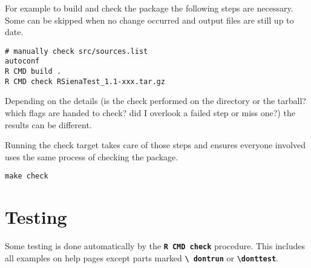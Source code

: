 \documentclass[12pt, a4paper]{article}
\renewcommand{\=}{\,=\,}
\newcommand{\+}{\,+\,}
\newcommand{\sfn}[1]{\textbf{\texttt{#1}}}
\begin{document}
For example to build and check the package the following steps are necessary.
Some can be skipped when no change occurred and output files are still up to
date.
\begin{verbatim}
# manually check src/sources.list
autoconf
R CMD build .
R CMD check RSienaTest_1.1-xxx.tar.gz
\end{verbatim}
Depending on the details (is the check performed on the directory or the
tarball? which flags are handed to check? did I overlook a failed step or miss
one?) the results can be different.

Running the check target takes care of those steps and ensures everyone
involved uses the same process of checking the package.
\begin{verbatim}
make check
\end{verbatim}

\section{Testing}
Some testing is done automatically  by the \sfn{R CMD check} procedure. This
includes all examples on help pages except parts marked \sfn{\textbackslash
  dontrun} or \sfn{\textbackslash donttest}.
\end{document}
